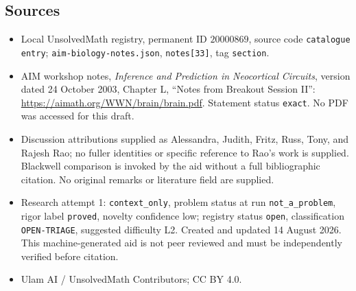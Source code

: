 \documentclass[11pt]{article}
\begin{document}
\subsection{Sources}
\begin{itemize}
\item Local UnsolvedMath registry, permanent ID \(20000869\), source code \texttt{catalogue entry}; \texttt{aim-biology-notes.json}, \texttt{notes[33]}, tag \texttt{section}.
\item AIM workshop notes, \emph{Inference and Prediction in Neocortical Circuits}, version dated 24 October 2003, Chapter L, ``Notes from Breakout Session II'': \url{https://aimath.org/WWN/brain/brain.pdf}. Statement status \texttt{exact}. No PDF was accessed for this draft.
\item Discussion attributions supplied as Alessandra, Judith, Fritz, Russ, Tony, and Rajesh Rao; no fuller identities or specific reference to Rao's work is supplied. Blackwell comparison is invoked by the aid without a full bibliographic citation. No original remarks or literature field are supplied.
\item Research attempt 1: \texttt{context\_only}, problem status at run \texttt{not\_a\_problem}, rigor label \texttt{proved}, novelty confidence low; registry status \texttt{open}, classification \texttt{OPEN-TRIAGE}, suggested difficulty L2. Created and updated 14 August 2026. This machine-generated aid is not peer reviewed and must be independently verified before citation.
\item Ulam AI / UnsolvedMath Contributors; CC BY 4.0.
\end{itemize}
\end{document}

